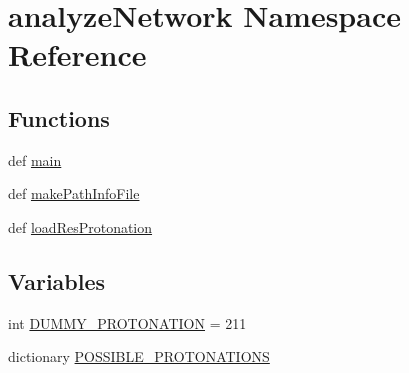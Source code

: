 \hypertarget{namespaceanalyze_network}{\section{analyze\-Network Namespace Reference}
\label{namespaceanalyze_network}
}
\subsection*{Functions}
\begin{DoxyCompactItemize}
\item 
def \hyperlink{namespaceanalyze_network_a35ddd1b09f75100c977b787de09e9a98}{main}
\item 
def \hyperlink{namespaceanalyze_network_a23533653f6b89a1dc1e54b1dfda919af}{make\-Path\-Info\-File}
\item 
def \hyperlink{namespaceanalyze_network_a1d771169ef3f40af2da197fce52333b5}{load\-Res\-Protonation}
\end{DoxyCompactItemize}
\subsection*{Variables}
\begin{DoxyCompactItemize}
\item 
int \hyperlink{namespaceanalyze_network_a9522a4ca48f20aa3cc2230c0d094f49f}{D\-U\-M\-M\-Y\-\_\-\-P\-R\-O\-T\-O\-N\-A\-T\-I\-O\-N} = 211
\item 
dictionary \hyperlink{namespaceanalyze_network_a4af941f8433e14aa7d958e74cc6272b8}{P\-O\-S\-S\-I\-B\-L\-E\-\_\-\-P\-R\-O\-T\-O\-N\-A\-T\-I\-O\-N\-S}
\end{DoxyCompactItemize}


